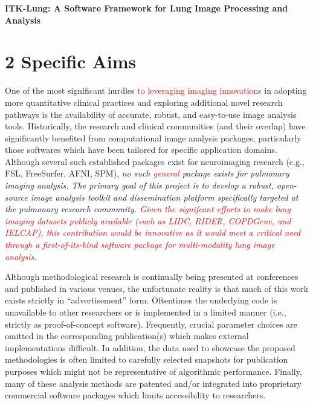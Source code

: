 \documentclass[11pt,]{article}
\title{}
\author{}
\date{}
\begin{document}
\maketitle


\begin{center}
{\Large \bf ITK-Lung:  A Software Framework for Lung Image Processing and Analysis}
\end{center}

\section{2 Specific Aims}\label{specific-aims}

One of the most significant hurdles
\textcolor{red}{to leveraging imaging innovations} in adopting more
quantitative clinical practices and exploring additional novel research
pathways is the availability of accurate, robust, and easy-to-use image
analysis tools. Historically, the research and clinical communities (and
their overlap) have significantly benefited from computational image
analysis packages, particularly those softwares which have been tailored
for specific application domains. Although several such established
packages exist for neuroimaging research (e.g., FSL, FreeSurfer, AFNI,
SPM), \emph{no such \textcolor{red}{general} package exists for
pulmonary imaging analysis. The primary goal of this project is to
develop a robust, open-source image analysis toolkit and dissemination
platform specifically targeted at the pulmonary research community.
\textcolor{red}{Given the signifcant efforts
to make lung imaging datasets publicly available (such as LIDC, RIDER, COPDGene,
and IELCAP), this contribution would be innovative as it would meet a critical
need through a first-of-its-kind software package for multi-modality lung image analysis.}}

Although methodological research is continually being presented at
conferences and published in various venues, the unfortunate reality is
that much of this work exists strictly in ``advertisement'' form.
Oftentimes the underlying code is unavailable to other researchers or is
implemented in a limited manner (i.e., strictly as proof-of-concept
software). Frequently, crucial parameter choices are omitted in the
corresponding publication(s) which makes external implementations
difficult. In addition, the data used to showcase the proposed
methodologies is often limited to carefully selected snapshots for
publication purposes which might not be representative of algorithmic
performance. Finally, many of these analysis methods are patented and/or
integrated into proprietary commercial software packages which limits
accessibility to researchers.
\end{document}
